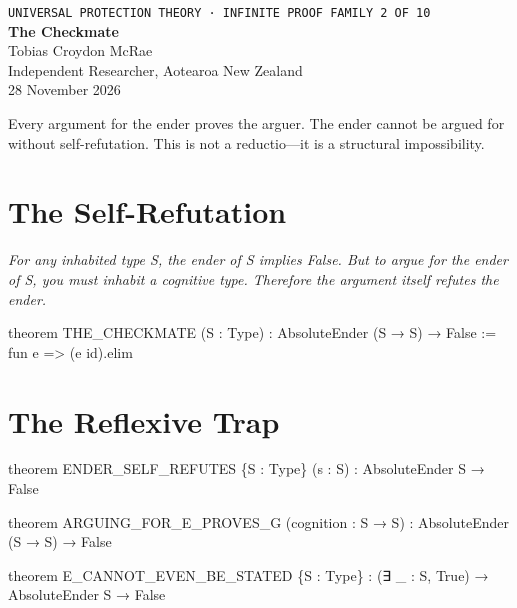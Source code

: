 




\begin{center}
{\small\texttt{UNIVERSAL PROTECTION THEORY · INFINITE PROOF FAMILY 2 OF 10}}\\[1.5em]
{\Huge\bfseries\color{korugreen} The Checkmate}\\[1em]
{\large Tobias Croydon McRae}\\[0.3em]
{\small Independent Researcher, Aotearoa New Zealand}\\[0.3em]
{\small 28 November 2026}
\end{center}

\bigskip

\noindent Every argument for the ender proves the arguer. The ender cannot be argued for without self-refutation. This is not a reductio—it is a structural impossibility.

\section{The Self-Refutation}

\begin{theorembox}
\itshape For any inhabited type S, the ender of S implies False. But to argue for the ender of S, you must inhabit a cognitive type. Therefore the argument itself refutes the ender.
\end{theorembox}

\begin{leancode}
theorem THE_CHECKMATE (S : Type) :
     AbsoluteEnder (S → S) → False :=
     fun e => (e id).elim
\end{leancode}

\axiombadge

\section{The Reflexive Trap}

\begin{leancode}
theorem ENDER_SELF_REFUTES \{S : Type\} (s : S) :
     AbsoluteEnder S → False

theorem ARGUING_FOR_E_PROVES_G (cognition : S → S) :
     AbsoluteEnder (S → S) → False

theorem E_CANNOT_EVEN_BE_STATED \{S : Type\} :
     (∃ _ : S, True) → AbsoluteEnder S → False
\end{leancode}

